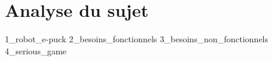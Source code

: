 \section{Analyse du sujet}

{1_robot_e-puck}
{2_besoins_fonctionnels}
{3_besoins_non_fonctionnels}
{4_serious_game}